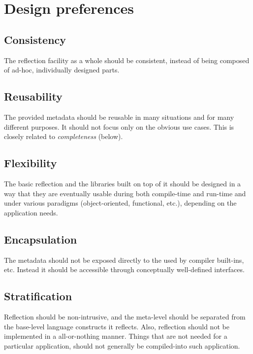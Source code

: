 \section{Design preferences}


\subsection{Consistency}

The reflection facility as a whole
should be consistent, instead of being composed of ad-hoc, individually
designed parts.

\subsection{Reusability}

The provided metadata should be reusable
in many situations and for many different purposes. It should not focus only
on the obvious use cases. This is closely related to {\em completeness} (below).

\subsection{Flexibility}

The basic reflection and the libraries
built on top of it should be designed
in a way that they are eventually usable during both compile-time
and run-time and under various paradigms (object-oriented, functional, etc.),
depending on the application needs.

\subsection{Encapsulation}

The metadata should not be exposed directly to the used by compiler built-ins, etc.
Instead it should be accessible through conceptually well-defined interfaces.

\subsection{Stratification}

Reflection should be non-intrusive,
and the meta-level should be separated from the base-level language
constructs it reflects. Also, reflection should not be implemented
in a all-or-nothing manner. Things that are not needed for a particular application,
should not generally be compiled-into such application.

